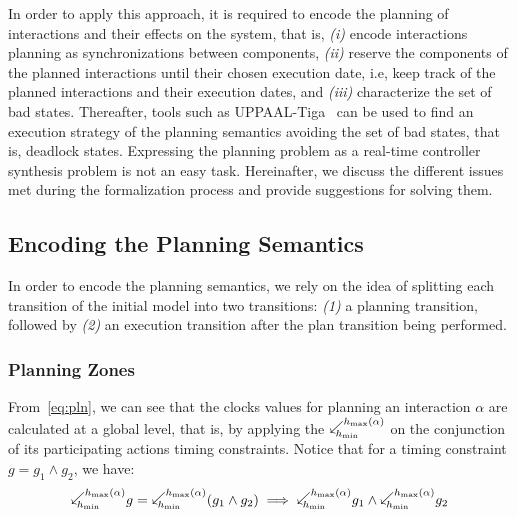 In order to apply this approach, it is required to encode the planning of interactions 
and their effects on the system, that is, \emph{(i)} encode interactions planning as 
synchronizations between components, \emph{(ii)} reserve the components of the planned 
interactions until their chosen execution date, i.e, keep track of the planned interactions 
and their execution dates, and \emph{(iii)} characterize the set of bad states. 
Thereafter, tools such as UPPAAL-Tiga~\cite{tiga} can be used to find an execution strategy of 
the planning semantics avoiding the set of bad states, that is, deadlock states.
Expressing the planning problem as a real-time controller synthesis problem is not 
an easy task. Hereinafter, we discuss the different issues met during the formalization 
process and provide suggestions for solving them.

\subsection{Encoding the Planning Semantics}

In order to encode the planning semantics, we rely on the idea of splitting each transition of 
the initial model into two transitions:
\emph{(1)} a planning transition, followed by \emph{(2)} an execution transition
after the plan transition being performed. 

\subsubsection{Planning Zones}

From~\ref{eq:pln}, we can see that the clocks values for planning an interaction 
$\alpha$ are calculated at a global level, that is, by applying the 
$\backwardp{\hmin}{\hmx}$ on the conjunction of its participating actions timing constraints.
Notice that for a timing constraint $g=g_1\wedge g_2$, we have:
\begin{equation}\label{eq:plz}
  \backwardp{\hmin}{\hmx} g=\backwardp{\hmin}{\hmx}(g_1\wedge g_2) \implies\backwardp{\hmin}{\hmx}
  g_1\wedge\backwardp{\hmin}{\hmx} g_2
\end{equation}

